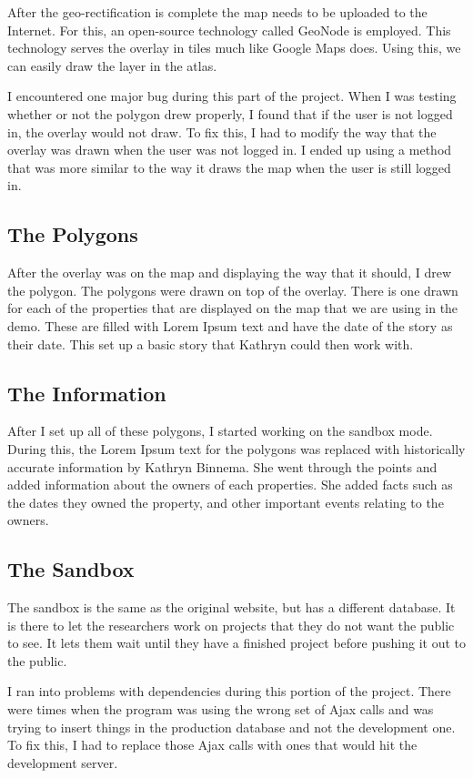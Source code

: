 \documentclass[12pt]{extarticle}
\begin{document}
		After the geo-rectification is complete the map needs to be uploaded to the Internet.  For this, an open-source technology called GeoNode is employed.  This 	technology serves the overlay in tiles much like Google Maps does.  Using this, we can easily draw the layer in the atlas.

		I encountered one major bug during this part of the project.  When I was testing whether or not the polygon drew properly, I found that if the user is not logged in, the overlay would not draw.  To fix this, I had to modify the way that the overlay was drawn when the user was not logged in.  I ended up using a method that was more similar to the way it draws the map when the user is still logged in.

	\subsection{The Polygons}
		After the overlay was on the map and displaying the way that it should, I drew the polygon.  The polygons were drawn on top of the overlay.  There is one drawn for each of the properties that are displayed on the map that we are using in the demo.  These are filled with Lorem Ipsum text and have the date of the story as their date.  This set up a basic story that Kathryn could then work with.

	\subsection{The Information}
		After I set up all of these polygons, I started working on the sandbox mode.  During this, the Lorem Ipsum text for the polygons was replaced with historically accurate information by Kathryn Binnema.  She went through the points and added information about the owners of each properties.  She added facts such as the dates they owned the property, and other important events relating to the owners.

	\subsection{The Sandbox}
		The sandbox is the same as the original website, but has a different database.  It is there to let the researchers work on projects that they do not want the public to see.  It lets them wait until they have a finished project before pushing it out to the public.

		I ran into problems with dependencies during this portion of the project.  There were times when the program was using the wrong set of Ajax calls and was trying to insert things in the production database and not the development one.  To fix this, I had to replace those Ajax calls with ones that would hit the development server.
\clearpage
\end{document}
